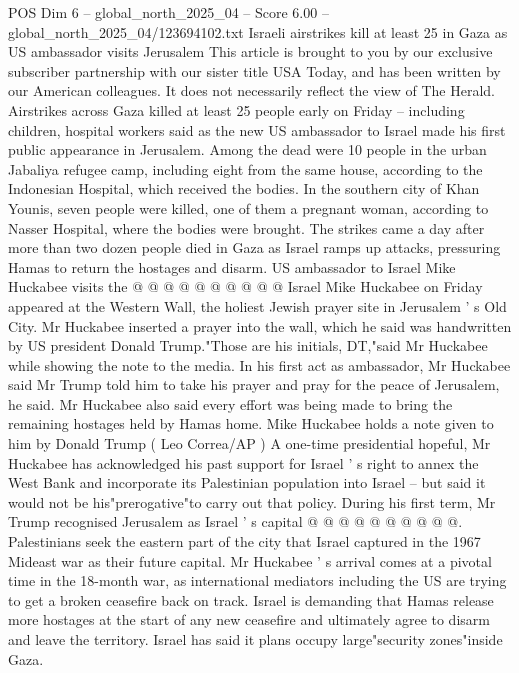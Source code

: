 \begin{textsample}{POS Dim 6 – global\_north\_2025\_04 – Score 6.00 – global\_north\_2025\_04/123694102.txt}  \label{ex:f6_pos_202}
Israeli airstrikes kill at least 25 in Gaza as US ambassador visits Jerusalem This article is brought to you by our exclusive subscriber partnership with our sister title USA Today, and has been written by our American colleagues.
It does not necessarily reflect the view of The Herald.
Airstrikes across Gaza killed at least 25 people early on Friday -- including children, hospital workers said as the new US ambassador to Israel made his first public appearance in Jerusalem.
Among the dead were 10 people in the urban Jabaliya refugee camp, including eight from the same house, according to the Indonesian Hospital, which received the bodies.
In the southern city of Khan Younis, seven people were killed, one of them a pregnant woman, according to Nasser Hospital, where the bodies were brought.
The strikes came a day after more than two dozen people died in Gaza as Israel ramps up attacks, pressuring Hamas to return the hostages and disarm.
US ambassador to Israel Mike Huckabee visits the @ @ @ @ @ @ @ @ @ @ Israel Mike Huckabee on Friday appeared at the Western Wall, the holiest Jewish prayer site in Jerusalem ' s Old City.
Mr Huckabee inserted a prayer into the wall, which he said was handwritten by US president Donald Trump."Those are his initials, DT,"said Mr Huckabee while showing the note to the media.
In his first act as ambassador, Mr Huckabee said Mr Trump told him to take his prayer and pray for the peace of Jerusalem, he said.
Mr Huckabee also said every effort was being made to bring the remaining hostages held by Hamas home.
Mike Huckabee holds a note given to him by Donald Trump ( Leo Correa/AP ) A one-time presidential hopeful, Mr Huckabee has acknowledged his past support for Israel ' s right to annex the West Bank and incorporate its Palestinian population into Israel -- but said it would not be his"prerogative"to carry out that policy.
During his first term, Mr Trump recognised Jerusalem as Israel ' s capital @ @ @ @ @ @ @ @ @ @.
Palestinians seek the eastern part of the city that Israel captured in the 1967 Mideast war as their future capital.
Mr Huckabee ' s arrival comes at a pivotal time in the 18-month war, as international mediators including the US are trying to get a broken ceasefire back on track.
Israel is demanding that Hamas release more hostages at the start of any new ceasefire and ultimately agree to disarm and leave the territory.
Israel has said it plans occupy large"security zones"inside Gaza.

\end{textsample}
